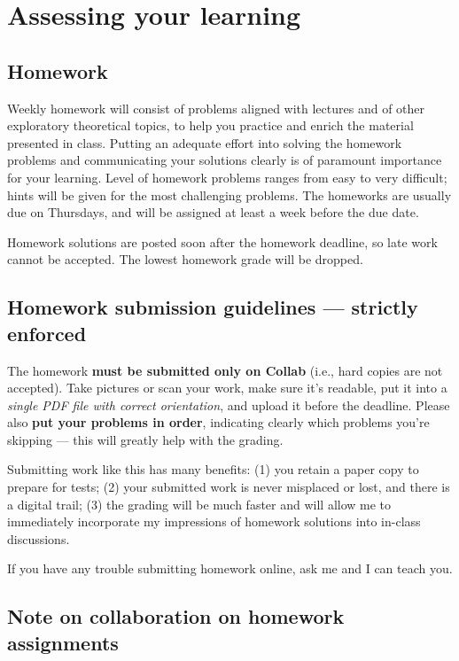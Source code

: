 \documentclass[oneside,11pt]{amsart}
\begin{document}
\section{Assessing your learning}

\subsection{Homework}

Weekly homework will consist of
problems aligned with lectures
and of other exploratory theoretical topics,
to help you practice and enrich the material presented in class.
Putting an adequate effort into solving the homework
problems and
communicating your solutions clearly is
of paramount importance for your learning.
Level of homework problems ranges from easy to very difficult;
hints will be given for the most challenging problems.
The homeworks are usually due on
Thursdays, and will be assigned at least a week before the due
date.

Homework solutions are posted soon after the
homework deadline, so late work cannot be accepted.
The lowest homework grade will be dropped.

\subsection*{Homework submission guidelines --- strictly enforced}
The homework \textbf{must be submitted only on Collab} (i.e., hard copies are not accepted).
Take pictures or scan your work,
make sure it's readable,
put it into a \emph{single PDF file with correct orientation},
and upload it before the deadline.
Please also \textbf{put your problems in order}, indicating clearly which problems you're skipping --- this will greatly help with the grading.

Submitting work like this has many benefits:
(1) you retain a paper copy to
prepare for tests;
(2) your submitted work is never misplaced or lost, and there is a digital trail;
(3) the grading will be much faster and will allow me to immediately
incorporate my impressions of homework solutions into in-class
discussions.

If you have any trouble submitting homework online, ask me and I can teach you.

\subsection*{Note on collaboration on homework assignments}
\label{collaboration}
\end{document}

